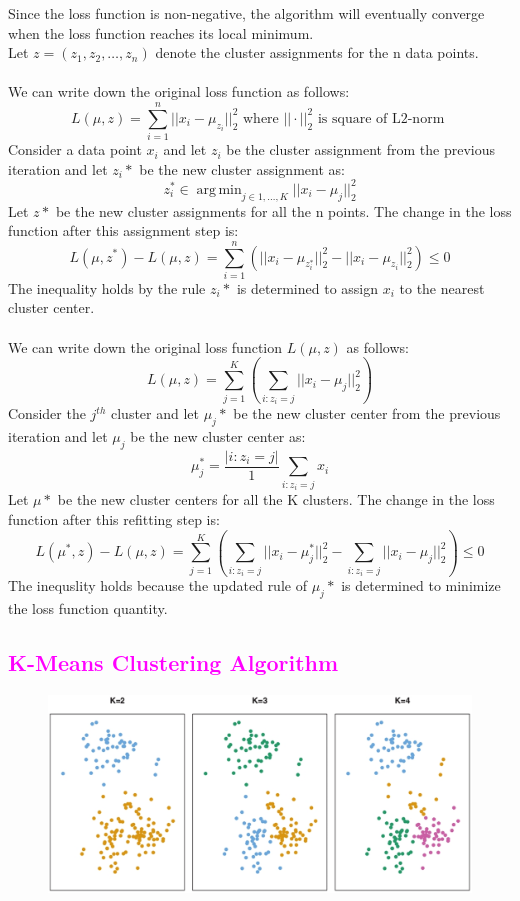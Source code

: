 \documentclass{book}
\DeclareMathOperator*{\argmin}{arg\,min}
\begin{document}
Since the loss function is non-negative, the algorithm will eventually converge when the loss function reaches its local minimum.\\
\vspace{1mm}
Let \(z = (z_1, z_2, \ldots, z_n)\) denote the cluster assignments for the n data points.\\
\vspace{1mm}
\\
We can write down the original loss function as follows:
\[
    L(\mu, z) = \sum_{i=1}^{n} ||x_i - \mu_{z_i}||_2^2 \text{ where } ||\cdot||_2^2 \text{ is square of L2-norm }
\]
Consider a data point \(x_i\) and let \(z_i\) be the cluster assignment from the previous iteration and let \(z_i*\) be the new cluster assignment as:
\[
    z_i^* \in \argmin_{j \in {1, \ldots, K}} ||x_i - \mu_j||_2^2
\]
Let \(z*\) be the new cluster assignments for all the n points. The change in the loss function after this assignment step is:
\[
    L(\mu, z^*) - L(\mu, z) = \sum_{i=1}^{n}(||x_i - \mu_{z_i^*}||_2^2 - ||x_i - \mu_{z_i}||_2^2) \leq 0
\]
The inequality holds by the rule \(z_i*\) is determined to assign \(x_i\) to the nearest cluster center.\\
\vspace{1mm}
\\
We can write down the original loss function \(L(\mu, z)\) as follows:
\[
    L(\mu, z) = \sum_{j=1}^{K} (\sum_{i: z_i = j} ||x_i - \mu_j||_2^2)
\]
Consider the \(j^{th}\) cluster and let \(\mu_j*\) be the new cluster center from the previous iteration and let \(\mu_j\) be the new cluster center as:
\[
    \mu_j^* = \frac{|{i: z_i = j}|}{1} \sum_{i: z_i = j} x_i
\]
Let \(\mu*\) be the new cluster centers for all the K clusters. The change in the loss function after this refitting step is:
\[
    L(\mu^*, z) - L(\mu, z) = \sum_{j=1}^{K} (\sum_{i: z_i = j} ||x_i - \mu_j^*||_2^2 - \sum_{i: z_i = j} ||x_i - \mu_j||_2^2) \leq 0
\]
The inequslity holds because the updated rule of \(\mu_j*\) is determined to minimize the loss function quantity.\\
\textcolor{magenta}{\section{\textbf{K-Means Clustering Algorithm}}}
\begin{figure}
    \centering
    \includegraphics[scale=0.2]{chapter 5/ch5_figure3.jpeg}
\end{figure}
\end{document}
